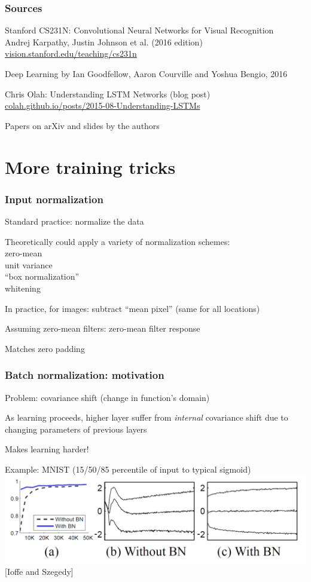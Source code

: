 \documentclass[xcolor=dvipsnames]{beamer}
\begin{document}
\begin{frame}
  \frametitle{Sources}
  \bi
\item Stanford CS231N: Convolutional Neural Networks for Visual
  Recognition\\
Andrej Karpathy, Justin Johnson et al. (2016 edition)\\
\url{vision.stanford.edu/teaching/cs231n}
\item Deep Learning by Ian Goodfellow, Aaron Courville and Yoshua
  Bengio, 2016
\item Chris Olah: Understanding LSTM Networks (blog post)\\
\url{colah.github.io/posts/2015-08-Understanding-LSTMs}
\item Papers on arXiv and slides by the authors
\ei
\end{frame}

\section{More training tricks}

\begin{frame}
  \frametitle{Input normalization}
  \bi
\item Standard practice: normalize the data
\item Theoretically could apply a variety of normalization schemes:\\
zero-mean\\
unit variance\\
``box normalization''\\
whitening
\item In practice, for images: subtract ``mean pixel'' (same for all
  locations)
\item Assuming zero-mean filters: zero-mean filter response
\item Matches zero padding
\ei
\end{frame}

\begin{frame}
  \frametitle{Batch normalization: motivation}
  \bi
\item Problem: covariance shift (change in function's domain)
\item As learning proceeds, higher layer suffer from \emph{internal}
  covariance shift due to changing parameters of previous layers
\item Makes learning harder!
\item Example: MNIST (15/50/85 percentile of input to typical sigmoid)
\includegraphics[width=.8\textwidth]{bn-mnist}\\
{[Ioffe and Szegedy]}
\ei

\end{frame}
\end{document}
